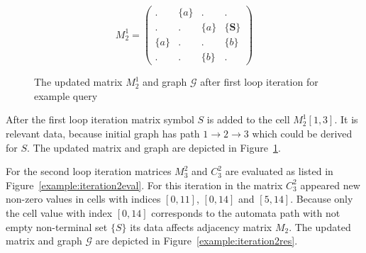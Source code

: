 \begin{figure}[h]
    \begin{subfigure}[]{0.5\textwidth}
    \centering
    $$
    M_2^1 =
    \begin{pmatrix}
    . & \{a\} & . & .     \\
    . & . & \{a\} & \{\textbf{S}\} \\
    \{a\} & . & . & \{b\} \\
    . & . & \{b\} & .
    \end{pmatrix}
    $$
    \end{subfigure}
    \begin{subfigure}[]{0.4\textwidth}
    \centering
    \end{subfigure}
    \caption{The updated matrix $M_2^1$ and graph $\mathcal{G}$ after first loop iteration for example query}
    \label{example:iteration1res}
\end{figure}

After the first loop iteration matrix symbol $S$ is added to the cell $M_2^1[1,3]$. It is relevant data, because initial graph has path $1 \to 2 \to 3$ which could be derived for $S$. The updated matrix and graph are depicted in Figure~\ref{example:iteration1res}.

For the second loop iteration matrices $M_3^2$ and $C_3^2$ are evaluated as listed in Figure~\ref{example:iteration2eval}. For this iteration in the matrix $C_3^2$ appeared new non-zero values in cells with indices $[0,11]$, $[0,14]$ and $[5,14]$. Because only the cell value with index $[0,14]$ corresponds to the automata path with not empty non-terminal set $\{S\}$ its data affects adjacency matrix $M_2$. The updated matrix and graph $\mathcal{G}$ are depicted in Figure~\ref{example:iteration2res}.

